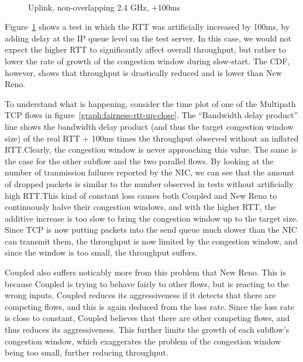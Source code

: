 \begin{figure}[h]
 \centering
 \subfloat[][CDF] {\
   \label{graph:fairness-rtt-up-cdf}
 }
 \\
 \subfloat[][Multipath TCP time plot] {\
   \label{graph:fairness-rtt-up-close}
 }
 \caption{Uplink, non-overlapping 2.4 GHz, +100ms}\label{graph:fairness-rtt-up}
\end{figure}

Figure~\ref{graph:fairness-rtt-up} shows a test in which the RTT was
artificially increased by 100ms, by adding delay at the IP queue level on the
test server. In this case, we would not expect the higher RTT to significantly
affect overall throughput, but rather to lower the rate of growth of the
congestion window during slow-start. The CDF, however, shows that throughput is
drastically reduced and is lower than New Reno.

To understand what is happening, consider the time plot of one of the Multipath
TCP flows in figure~\ref{graph:fairness-rtt-up-close}. The ``Bandwidth delay
product'' line shows the bandwidth delay product (and thus the target congestion
window size) of the real RTT + 100ms times the throughput observed without an
inflated RTT.\@ Clearly, the congestion window is never approaching this value.
The same is the case for the other subflow and the two parallel flows. By
looking at the number of tranmission failures reported by the NIC, we can see
that the amount of dropped packets is similar to the number observed in tests
without artificially high RTT.\@ This kind of constant loss causes both Coupled
and New Reno to continuously halve their congestion windows, and with the higher
RTT, the additive increase is too slow to bring the congestion window up to the
target size. Since TCP is now putting packets into the send queue much slower
than the NIC can transmit them, the throughput is now limited by the congestion
window, and since the window is too small, the throughput suffers.

Coupled also suffers noticably more from this problem that New Reno. This is
because Coupled is trying to behave fairly to other flows, but is reacting to
the wrong inputs.  Coupled reduces its aggressiveness if it detects that there
are competing flows, and this is again deduced from the loss rate. Since the
loss rate is close to constant, Coupled believes that there are other competing
flows, and thus reduces its aggressiveness. This further limits the growth of
each subflow's congestion window, which exaggerates the problem of the
congestion window being too small, further reducing throughput.

